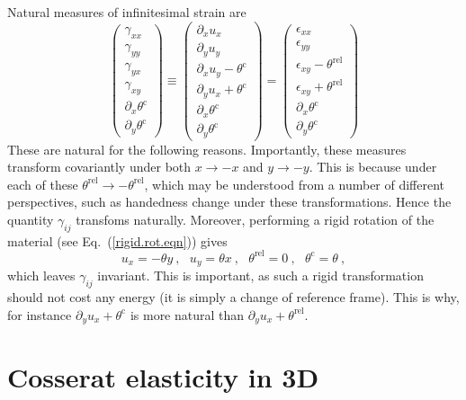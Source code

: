 \documentclass[]{scrreprt}
\newcommand{\pl}{\partial}
\newcommand{\thetac}{\theta^{\mathrm{c}}}
\newcommand{\thetarel}{\theta^{\mathrm{rel}}}
\newcommand{\ep}{\epsilon}
\newcommand{\ga}{\gamma}
\newcommand{\spa}{\ \ \ }
\begin{document}
Natural measures of infinitesimal strain are
\begin{equation}
\left(\begin{array}{c}
\gamma_{xx} \\
\gamma_{yy} \\
\gamma_{yx} \\
\gamma_{xy} \\
\pl_{x}\thetac \\
\pl_{y}\thetac
\end{array}
\right) \equiv
\left(\begin{array}{c}
\pl_{x}u_{x} \\
\pl_{y}u_{y} \\
\pl_{x}u_{y}-\thetac \\
\pl_{y}u_{x}+\thetac \\
\pl_{x}\thetac \\
\pl_{y}\thetac
\end{array}
\right) =
\left(\begin{array}{c}
\ep_{xx} \\
\ep_{yy} \\
\ep_{xy}-\thetarel \\
\ep_{xy}+\thetarel \\
\pl_{x}\thetac \\
\pl_{y}\thetac
\end{array}
\right)
\label{nat.2d.deform.measures}
\end{equation}
These are natural for the following reasons.  Importantly, these
measures transform covariantly under both
$x\rightarrow -x$ and $y\rightarrow -y$.    This is
because under each of these $\thetarel\rightarrow -\thetarel$, which may be
understood from a number of different perspectives, such as handedness
change under these transformations.  Hence the quantity $\ga_{ij}$
transfoms naturally.  Moreover, performing a rigid rotation of the
material (see Eq.~(\ref{rigid.rot.eqn})) gives
$$
u_{x}=-\theta y \ , \spa
u_{y}=\theta x \ , \spa
\thetarel = 0 \ , \spa
\thetac = \theta \ ,
$$
which leaves $\ga_{ij}$ invariant.  This is important, as such a rigid
transformation should not cost any energy (it is simply a change of
reference frame).  This is why, for instance $\pl_{y}u_{x}+\thetac$ is
more natural than $\pl_{y}u_{x}+\thetarel$.



\chapter{Cosserat elasticity in 3D}
\label{3d.coss.elas.gen.sec}
\end{document}
